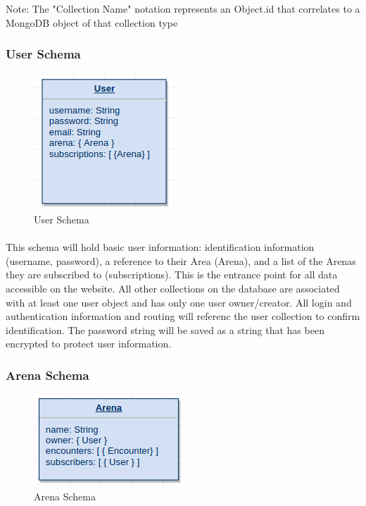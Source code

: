 \documentclass[12pt,a4paper]{report}
\begin{document}
		Note: The { "Collection Name" } notation represents an Object.id that correlates to a MongoDB object of that collection type
		\subsubsection{User Schema}
			\begin{figure}[h]
				\centering
				\includegraphics[scale=.75]{schema-user}
				\caption{User Schema}
				\label{fig: User Schema }
			\end{figure}
			
		\paragraph{}This schema will hold basic user information: identification information (username, password), a reference to their Area (Arena), and a list of the Arenas they are subscribed to (subscriptions). This is the entrance point for all data accessible on the website. All other collections on the database are associated with at least one user object and has only one user owner/creator. All login and authentication information and routing will referenc the user collection to confirm identification. The password string will be saved as a string that has been encrypted to protect user information.
		\subsubsection{Arena Schema}
		
			\begin{figure}[h]
				\centering
				\includegraphics[scale=.75]{schema-arena}
				\caption{Arena Schema}
				\label{fig: Arena Schema }
			\end{figure}
		
\end{document}
